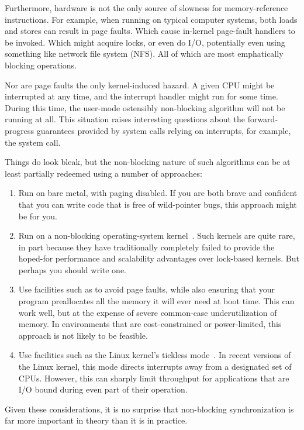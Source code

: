Furthermore, hardware is not the only source of slowness for
memory-reference instructions.
For example, when running on typical computer systems, both loads and
stores can result in page faults.
Which cause in-kernel page-fault handlers to be invoked.
Which might acquire locks, or even do I/O, potentially even using
something like network file system (NFS)\@.
All of which are most emphatically blocking operations.

Nor are page faults the only kernel-induced hazard.
A given CPU might be interrupted at any time, and the interrupt
handler might run for some time.
During this time, the user-mode ostensibly non-blocking algorithm
will not be running at all.
This situation raises interesting questions about the forward-progress
guarantees provided by system calls relying on interrupts, for example,
the  system call.

Things do look bleak, but the non-blocking nature of such algorithms
can be at least partially redeemed using a number of approaches:

\begin{enumerate}
\item	Run on bare metal, with paging disabled.
	If you are both brave and confident that you can write code that
	is free of wild-pointer bugs, this approach might be for you.
\item	Run on a non-blocking operating-system kernel~\cite{Cheriton96a}.
	Such kernels are quite rare, in part because they have
	traditionally completely failed to provide the hoped-for
	performance and scalability advantages over lock-based kernels.
	But perhaps you should write one.
\item	Use facilities such as  to avoid page faults,
	while also ensuring that your program preallocates all the
	memory it will ever need at boot time.
	This can work well, but at the expense of severe common-case
	underutilization of memory.
	In environments that are cost-constrained or power-limited,
	this approach is not likely to be feasible.
\item	Use facilities such as the Linux kernel's
	 tickless mode~\cite{JonCorbet2013NO-HZ-FULL}.
	In recent versions of the Linux kernel, this mode directs
	interrupts away from a designated set of CPUs.
	However, this can sharply limit throughput for applications that
	are I/O bound during even part of their operation.
\end{enumerate}

Given these considerations, it is no surprise that non-blocking
synchronization is far more important in theory than it is in practice.

